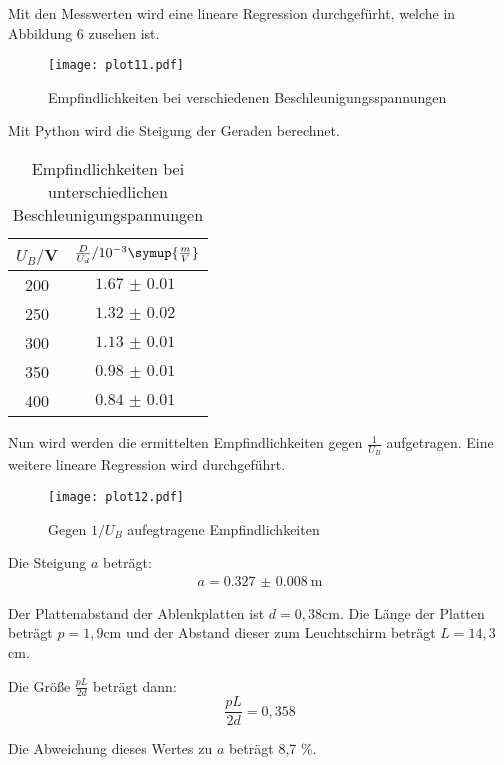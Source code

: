 Mit den Messwerten wird eine lineare Regression durchgefürht, welche in Abbildung 6 zusehen ist.

\begin{figure}
  \centering
  \texttt{[image: plot11.pdf]}
  \caption{Empfindlichkeiten bei verschiedenen Beschleunigungsspannungen}
  \label{fig:plot}
\end{figure}

Mit Python wird die Steigung der Geraden berechnet. \\

\begin{table}[H]
  \centering
  \caption{Empfindlichkeiten bei unterschiedlichen Beschleunigungspannungen}
  \label{tab:Spannungsamplitude}
  \begin{tabular}{c c}
    \toprule
    $U_B/$V & $\frac{D}{U_d} / 10^{-3}\symup{\frac{m}{V}}$ \\
    \midrule
    200 & $\SI{1.67(1)}{}$ \\
    250 & $\SI{1.32(2)}{}$ \\
    300 & $\SI{1.13(1)}{}$ \\
    350 & $\SI{0.98(1)}{}$ \\
    400 & $\SI{0.84(1)}{}$ \\
    \bottomrule
  \end{tabular}
\end{table}


Nun wird werden die ermittelten Empfindlichkeiten gegen $\frac{1}{U_B}$ aufgetragen. Eine weitere
lineare Regression wird durchgeführt.

\begin{figure}
  \centering
  \texttt{[image: plot12.pdf]}
  \caption{Gegen $1/U_B$ aufegtragene Empfindlichkeiten}
  \label{fig:plot}
\end{figure}

Die Steigung $a$ beträgt:
\begin{align*}
  a = \SI{0.327(8)}{\meter}
\end{align*}

Der Plattenabstand der Ablenkplatten ist $d = 0,38$cm. Die Länge der Platten beträgt $p= 1,9$cm und der
Abstand dieser zum Leuchtschirm beträgt $L = 14,3$cm.

Die Größe $\frac{pL}{2d}$ beträgt dann:
\begin{equation*}
  \frac{pL}{2d} = 0,358
\end{equation*}

Die Abweichung dieses Wertes zu $a$ beträgt 8,7 \%.

